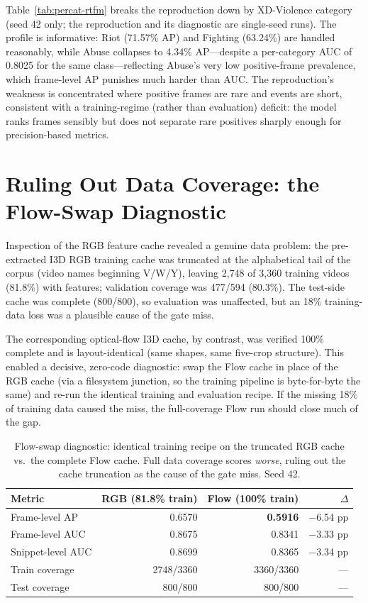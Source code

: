 Table~\ref{tab:percat-rtfm} breaks the reproduction down by XD-Violence
category (seed 42 only; the reproduction and its diagnostic are single-seed
runs). The profile is informative: Riot (71.57\% AP) and Fighting (63.24\%)
are handled reasonably, while Abuse collapses to 4.34\% AP---despite a
per-category AUC of 0.8025 for the same class---reflecting Abuse's very low
positive-frame prevalence, which frame-level AP punishes much harder than
AUC. The reproduction's weakness is concentrated where positive frames are
rare and events are short, consistent with a training-regime (rather than
evaluation) deficit: the model ranks frames sensibly but does not separate
rare positives sharply enough for precision-based metrics.

\section{Ruling Out Data Coverage: the Flow-Swap Diagnostic}
\label{sec:appa-flow}

Inspection of the RGB feature cache revealed a genuine data problem: the
pre-extracted I3D RGB training cache was truncated at the alphabetical tail
of the corpus (video names beginning V/W/Y), leaving 2{,}748 of 3{,}360
training videos (81.8\%) with features; validation coverage was 477/594
(80.3\%). The test-side cache was complete (800/800), so evaluation was
unaffected, but an 18\% training-data loss was a plausible cause of the gate
miss.

The corresponding optical-flow I3D cache, by contrast, was verified 100\%
complete and is layout-identical (same shapes, same five-crop structure).
This enabled a decisive, zero-code diagnostic: swap the Flow cache in place
of the RGB cache (via a filesystem junction, so the training pipeline is
byte-for-byte the same) and re-run the identical training and evaluation
recipe. If the missing 18\% of training data caused the miss, the
full-coverage Flow run should close much of the gap.

\begin{table}[t]
\centering
\caption{Flow-swap diagnostic: identical training recipe on the truncated
RGB cache vs.\ the complete Flow cache. Full data coverage scores
\emph{worse}, ruling out the cache truncation as the cause of the gate miss.
Seed 42.}
\label{tab:appa-flow}
\begin{tabular}{lrrr}
\toprule
Metric & RGB (81.8\% train) & Flow (100\% train) & $\Delta$ \\
\midrule
Frame-level AP & 0.6570 & \textbf{0.5916} & $-$6.54 pp \\
Frame-level AUC & 0.8675 & 0.8341 & $-$3.33 pp \\
Snippet-level AUC & 0.8699 & 0.8365 & $-$3.34 pp \\
Train coverage & 2748/3360 & 3360/3360 & --- \\
Test coverage & 800/800 & 800/800 & --- \\
\bottomrule
\end{tabular}
\end{table}

